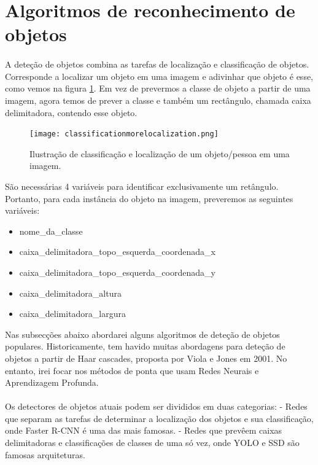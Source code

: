 \section{Algoritmos de reconhecimento de objetos}
\label{chap2:sec:estadoatual}

\paragraph{}
A deteção de objetos combina as tarefas de localização e classificação de objetos. Corresponde a localizar um objeto em uma imagem e adivinhar que objeto é esse, como vemos na figura \ref{img:classificacaolocalizacao}. Em vez de prevermos a classe de objeto a partir de uma imagem, agora temos de prever a classe e também um rectângulo, chamada caixa delimitadora, contendo esse objeto.

\begin{figure}[h!]
  \centering
  \label{img:classificacaolocalizacao}
  \texttt{[image: classificationmorelocalization.png]}
  \caption{Ilustração de classificação e localização de um objeto/pessoa em uma imagem.}
\end{figure}

São necessárias 4 variáveis para identificar exclusivamente um retângulo. Portanto, para cada instância do objeto na imagem, preveremos as seguintes variáveis:
\begin{itemize}
    \item nome\_da\_classe
    \item caixa\_delimitadora\_topo\_esquerda\_coordenada\_x
    \item caixa\_delimitadora\_topo\_esquerda\_coordenada\_y
    \item caixa\_delimitadora\_altura
    \item caixa\_delimitadora\_largura
\end{itemize}

Nas subsecções abaixo abordarei alguns algoritmos de deteção de objetos populares. Historicamente, tem havido muitas abordagens para deteção de objetos a partir de Haar cascades, proposta por Viola e Jones em 2001. No entanto, irei focar nos métodos de ponta que usam Redes Neurais e Aprendizagem Profunda.

\paragraph{}
Os detectores de objetos atuais podem ser divididos em duas categorias:
\newline - Redes que separam as tarefas de determinar a localização dos objetos e sua classificação, onde Faster \ac{R-CNN} é uma das mais famosas.
\newline - Redes que prevêem caixas delimitadoras e classificações de classes de uma só vez, onde \ac{YOLO} e \ac{SSD} são famosas arquiteturas.

